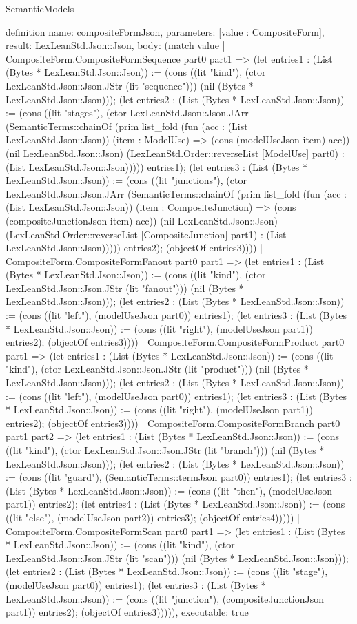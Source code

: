 \begin{lexlean}{SemanticModels}
\begin{semanticmodule}
definition{
  name: compositeFormJson,
  parameters: [value : CompositeForm],
  result: LexLeanStd.Json::Json,
  body: (match value
    | CompositeForm.CompositeFormSequence part0 part1 => (let entries1 : (List (Bytes * LexLeanStd.Json::Json)) := (cons ((lit "kind"), (ctor LexLeanStd.Json::Json.JStr (lit "sequence"))) (nil (Bytes * LexLeanStd.Json::Json))); (let entries2 : (List (Bytes * LexLeanStd.Json::Json)) := (cons ((lit "stages"), (ctor LexLeanStd.Json::Json.JArr (SemanticTerms::chainOf (prim list_fold (fun (acc : (List LexLeanStd.Json::Json)) (item : ModelUse) => (cons (modelUseJson item) acc)) (nil LexLeanStd.Json::Json) (LexLeanStd.Order::reverseList [ModelUse] part0) : (List LexLeanStd.Json::Json))))) entries1); (let entries3 : (List (Bytes * LexLeanStd.Json::Json)) := (cons ((lit "junctions"), (ctor LexLeanStd.Json::Json.JArr (SemanticTerms::chainOf (prim list_fold (fun (acc : (List LexLeanStd.Json::Json)) (item : CompositeJunction) => (cons (compositeJunctionJson item) acc)) (nil LexLeanStd.Json::Json) (LexLeanStd.Order::reverseList [CompositeJunction] part1) : (List LexLeanStd.Json::Json))))) entries2); (objectOf entries3))))
    | CompositeForm.CompositeFormFanout part0 part1 => (let entries1 : (List (Bytes * LexLeanStd.Json::Json)) := (cons ((lit "kind"), (ctor LexLeanStd.Json::Json.JStr (lit "fanout"))) (nil (Bytes * LexLeanStd.Json::Json))); (let entries2 : (List (Bytes * LexLeanStd.Json::Json)) := (cons ((lit "left"), (modelUseJson part0)) entries1); (let entries3 : (List (Bytes * LexLeanStd.Json::Json)) := (cons ((lit "right"), (modelUseJson part1)) entries2); (objectOf entries3))))
    | CompositeForm.CompositeFormProduct part0 part1 => (let entries1 : (List (Bytes * LexLeanStd.Json::Json)) := (cons ((lit "kind"), (ctor LexLeanStd.Json::Json.JStr (lit "product"))) (nil (Bytes * LexLeanStd.Json::Json))); (let entries2 : (List (Bytes * LexLeanStd.Json::Json)) := (cons ((lit "left"), (modelUseJson part0)) entries1); (let entries3 : (List (Bytes * LexLeanStd.Json::Json)) := (cons ((lit "right"), (modelUseJson part1)) entries2); (objectOf entries3))))
    | CompositeForm.CompositeFormBranch part0 part1 part2 => (let entries1 : (List (Bytes * LexLeanStd.Json::Json)) := (cons ((lit "kind"), (ctor LexLeanStd.Json::Json.JStr (lit "branch"))) (nil (Bytes * LexLeanStd.Json::Json))); (let entries2 : (List (Bytes * LexLeanStd.Json::Json)) := (cons ((lit "guard"), (SemanticTerms::termJson part0)) entries1); (let entries3 : (List (Bytes * LexLeanStd.Json::Json)) := (cons ((lit "then"), (modelUseJson part1)) entries2); (let entries4 : (List (Bytes * LexLeanStd.Json::Json)) := (cons ((lit "else"), (modelUseJson part2)) entries3); (objectOf entries4)))))
    | CompositeForm.CompositeFormScan part0 part1 => (let entries1 : (List (Bytes * LexLeanStd.Json::Json)) := (cons ((lit "kind"), (ctor LexLeanStd.Json::Json.JStr (lit "scan"))) (nil (Bytes * LexLeanStd.Json::Json))); (let entries2 : (List (Bytes * LexLeanStd.Json::Json)) := (cons ((lit "stage"), (modelUseJson part0)) entries1); (let entries3 : (List (Bytes * LexLeanStd.Json::Json)) := (cons ((lit "junction"), (compositeJunctionJson part1)) entries2); (objectOf entries3))))),
  executable: true
}


\end{semanticmodule}
\end{lexlean}
